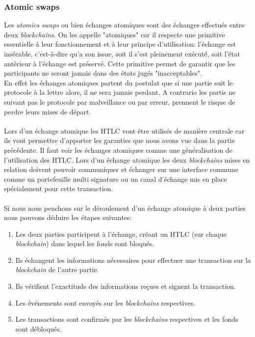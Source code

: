 \subsubsection{Atomic swaps}
Les \textit{atomics swaps} ou bien échanges atomiques sont des échanges effectués entre deux \textit{\gls{blockchain}s}\cite{herlihy2018atomic}. On les appelle "atomiques" car il respecte une primitive essentielle à leur fonctionnement et à leur principe d'utilisation: 
l'échange est insécable, c'est-à-dire qu'a son issue, soit il s'est pleinement exécuté, soit l'état antérieur à l'échange est préservé.
Cette primitive permet de garantir que les participants ne seront jamais dans des états jugés "inacceptables". \\
En effet les échanges atomiques partent du postulat que si une partie suit le protocole à la lettre alors, 
il ne sera jamais perdant. A contrario les partis ne suivant pas le protocole par malveillance ou par erreur, prennent le risque de perdre leurs mises de départ.\\ \\
Lors d'un échange atomique les HTLC vont être utilisés de manière centrale car ils vont permettre d'apporter les garanties que nous avons vue dans la partie précédente. Il faut voir les échanges atomiques comme une généralisation de l'utilisation des HTLC. Lors d'un échange atomique les deux \textit{\gls{blockchain}s} mises en relation doivent pouvoir communiquer et échanger sur une interface commune comme un portefeuille multi signature ou un canal d'échange mis en place spécialement pour cette transaction. \\ \\
Si nous nous penchons sur le déroulement d'un échange atomique à deux parties nous pouvons déduire les étapes suivantes: 
\begin{enumerate}
    \item Les deux parties participent à l'échange, créant un HTLC (sur chaque \textit{\gls{blockchain}}) dans lequel les fonds sont bloqués. 
    \item Ils échangent les informations nécessaires pour effectuer une transaction sur la \textit{\gls{blockchain}} de l'autre partie. 
    \item Ils vérifient l'exactitude des informations reçues et signent la transaction. 
    \item Les événements sont envoyés sur les \textit{\gls{blockchain}s} respectives. 
    \item Les transactions sont confirmés par les \textit{\gls{blockchain}s} respectives et les fonds sont débloqués.
\end{enumerate}

